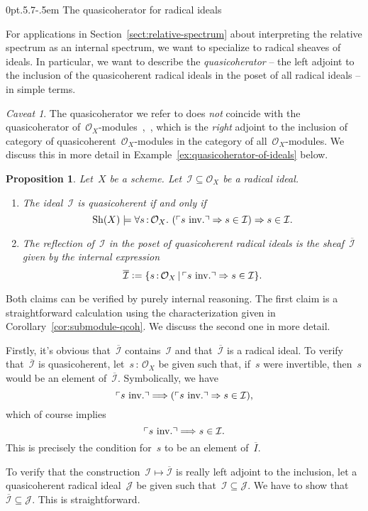 \documentclass[10pt,reqno,a4paper]{amsbook}
\makeatletter
\theoremstyle{definition}
\theoremstyle{plain}
\newtheorem{prop}[defn]{Proposition}
\theoremstyle{remark}
\newtheorem{caveat}[defn]{Caveat}
\renewcommand{\O}{\mathcal{O}}
\newcommand{\I}{\mathcal{I}}
\newcommand{\J}{\mathcal{J}}
\newcommand{\Sh}{\mathrm{Sh}}
\newcommand{\?}{\,{:}\,}
\renewcommand{\_}{\mathpunct{.}\,}
\newcommand{\speak}[1]{\ulcorner\text{\textnormal{#1}}\urcorner}
\newcommand{\inv}{inv.\@}
\newcommand{\stacksproject}[1]{\cite[{\href{http://stacks.math.columbia.edu/tag/#1}{Tag~#1}}]{stacks-project}}
\newcommand{\defeq}{\vcentcolon=}
\renewenvironment{proof}[1][\proofname]{\par
  \pushQED{\qed}%
  \normalfont \topsep6\p@\@plus6\p@\relax
  \trivlist
  \item[\hskip\labelsep
        \itshape
    #1\@addpunct{.}]\ignorespaces
}{%
  \popQED\endtrivlist\@endpefalse
}
\def\subsection{\@startsection{subsection}{2}%
  {0pt}{.5\linespacing\@plus.7\linespacing}{-.5em}%
  {\normalfont\bfseries}}
\makeatother
\begin{document}
\subsection{The quasicoherator for radical ideals}

For applications in Section~\ref{sect:relative-spectrum} about interpreting the
relative spectrum as an internal spectrum, we want to specialize to radical
sheaves of ideals. In particular, we want to describe the \emph{quasicoherator} --
the left adjoint to the inclusion of the quasicoherent radical ideals in the
poset of all radical ideals -- in simple terms.

\begin{caveat}The quasicoherator we refer to does \emph{not} coincide with the
quasicoherator
of~$\O_X$-modules~\stacksproject{077P},~\cite{thomason-trobaugh}, which is the
\emph{right} adjoint to the inclusion of category of
quasicoherent~$\O_X$-modules in the category of all~$\O_X$-modules. We discuss
this in more detail in Example~\ref{ex:quasicoherator-of-ideals} below.
\end{caveat}

\begin{prop}\label{prop:quasicoherator-structure-sheaf}
Let~$X$ be a scheme. Let~$\I \subseteq \O_X$ be a radical ideal.
\begin{enumerate}
\item The ideal~$\I$ is quasicoherent if and only if
\[ \Sh(X) \models \forall s\?\O_X\_ (\speak{$s$ \inv} \Rightarrow s\in\I)
\Rightarrow s\in\I. \]
\item The reflection of~$\I$ in the poset of quasicoherent radical ideals is
the sheaf~$\overline{\I}$ given by the internal expression
\[ \overline{\I} \defeq \{ s\?\O_X \,|\, \speak{$s$ \inv} \Rightarrow s\in\I
\}. \]
\end{enumerate}
\end{prop}
\begin{proof}Both claims can be verified by purely internal reasoning. The
first claim is a straightforward calculation using the characterization given in
Corollary~\ref{cor:submodule-qcoh}. We discuss the second one in more detail.

Firstly, it's obvious that~$\overline{\I}$ contains~$\I$ and
that~$\overline{\I}$ is a radical ideal. To verify that~$\overline{\I}$ is
quasicoherent, let~$s\?\O_X$ be given such that, if~$s$ were invertible,
then~$s$ would be an element of~$\overline{\I}$. Symbolically, we have
\[ \speak{$s$ \inv} \Longrightarrow (\speak{$s$ \inv} \Rightarrow s\in\I), \]
which of course implies
\[ \speak{$s$ \inv} \Longrightarrow s\in\I. \]
This is precisely the condition for~$s$ to be an element of~$\overline{I}$.

To verify that the construction~$\I \mapsto \overline{\I}$ is really left
adjoint to the inclusion, let a quasicoherent radical ideal~$\J$ be given such
that~$\I \subseteq \J$. We have to show that~$\overline{\I} \subseteq \J$. This
is straightforward.
\end{proof}
\end{document}
